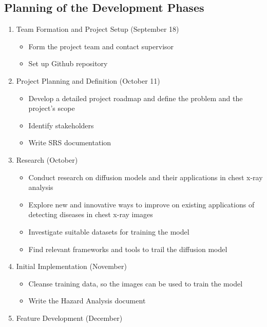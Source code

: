 \documentclass[12pt]{article}
\begin{document}
\subsection{Planning of the Development Phases}
\begin{enumerate}
    \item {
        Team Formation and Project Setup (September 18)
        \begin{itemize}
            \item Form the project team and contact supervisor
            \item Set up Github repository
        \end{itemize}
    }
    \item {
        Project Planning and Definition (October 11)
        \begin{itemize}
            \item Develop a detailed project roadmap and define the problem and the project’s scope
            \item Identify stakeholders
            \item Write SRS documentation
        \end{itemize}
    }
    \item {
        Research (October)
        \begin{itemize}
            \item Conduct research on diffusion models and their applications in chest x-ray 
            analysis
            \item Explore new and innovative ways to improve on existing applications of detecting 
            diseases in chest x-ray images
            \item Investigate suitable datasets for training the model
            \item Find relevant frameworks and tools to trail the diffusion model
        \end{itemize}
    }
    \item {
        Initial Implementation (November)
        \begin{itemize}
            \item Cleanse training data, so the images can be used to train the model
            \item Write the Hazard Analysis document
        \end{itemize}
    }
    \item {
        Feature Development (December)
        \begin{itemize}

\end{itemize}}
\end{enumerate}
\end{document}
